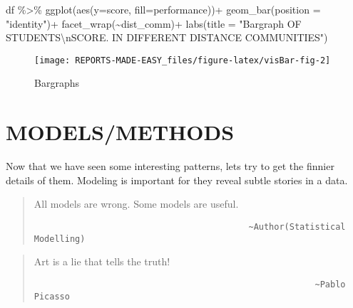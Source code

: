 \documentclass[
]{book}
\newenvironment{Shaded}{\begin{snugshade}}{\end{snugshade}}
\newcommand{\AttributeTok}[1]{\textcolor[rgb]{0.77,0.63,0.00}{#1}}
\newcommand{\FunctionTok}[1]{\textcolor[rgb]{0.00,0.00,0.00}{#1}}
\newcommand{\NormalTok}[1]{#1}
\newcommand{\SpecialCharTok}[1]{\textcolor[rgb]{0.00,0.00,0.00}{#1}}
\newcommand{\StringTok}[1]{\textcolor[rgb]{0.31,0.60,0.02}{#1}}
\begin{document}
\begin{Shaded}
\begin{Highlighting}[]
\NormalTok{df }\SpecialCharTok{\%\textgreater{}\%} 
  \FunctionTok{ggplot}\NormalTok{(}\FunctionTok{aes}\NormalTok{(}\AttributeTok{y=}\NormalTok{score, }\AttributeTok{fill=}\NormalTok{performance))}\SpecialCharTok{+}
  \FunctionTok{geom\_bar}\NormalTok{(}\AttributeTok{position =} \StringTok{"identity"}\NormalTok{)}\SpecialCharTok{+}
  \FunctionTok{facet\_wrap}\NormalTok{(}\SpecialCharTok{\textasciitilde{}}\NormalTok{dist\_comm)}\SpecialCharTok{+}
  \FunctionTok{labs}\NormalTok{(}\AttributeTok{title =} \StringTok{"Bargraph OF STUDENTS\textquotesingle{}}\SpecialCharTok{\textbackslash{}n}\StringTok{SCORE. IN DIFFERENT DISTANCE COMMUNITIES"}\NormalTok{)}
\end{Highlighting}
\end{Shaded}

\begin{figure}

{\centering \texttt{[image: REPORTS-MADE-EASY\_files/figure-latex/visBar-fig-2]} 

}

\caption{Bargraphs}\label{fig:visBar-fig-2}
\end{figure}

\hypertarget{mods}{%
\chapter{MODELS/METHODS}\label{mods}}

Now that we have seen some interesting patterns, lets try to get the finnier details of them.
Modeling is important for they reveal subtle stories in a data.

\begin{quote}
All models are wrong. Some models are useful.

\begin{verbatim}
                                          ~Author(Statistical Modelling)
\end{verbatim}
\end{quote}

\begin{quote}
Art is a lie that tells the truth!

\begin{verbatim}
                                                       ~Pablo Picasso
\end{verbatim}
\end{quote}
\end{document}
